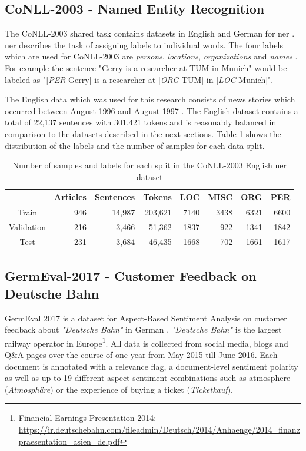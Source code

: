 \subsection{CoNLL-2003 - Named Entity Recognition}

The CoNLL-2003 shared task contains datasets in English and German for \acrfull{ner} \cite{Erik2003}. \gls{ner} describes the task of assigning labels to individual words. The four labels which are used for CoNLL-2003 are \textit{persons}, \textit{locations}, \textit{organizations} and \textit{names} \cite{Erik2003}. For example the sentence "Gerry is a researcher at TUM in Munich" would be labeled as "[\textit{PER} Gerry] is a researcher at [\textit{ORG} TUM] in [\textit{LOC} Munich]".
\medskip

The English data which was used for this research consists of news stories which occurred between August 1996 and August 1997 \cite{Erik2003}. The English dataset contains a total of 22,137 sentences with 301,421 tokens and is reasonably balanced in comparison to the datasets described in the next sections. Table \ref{tab:05_conll2003DatasetStats} shows the distribution of the labels and the number of samples for each data split.

\begin{table}
	\centering
	\begin{tabular}{crrrrrrr}
		\toprule
		& Articles & Sentences & Tokens & LOC & MISC & ORG & PER \\ 
		\midrule
		Train & 946 & 14,987 & 203,621 & 7140 & 3438 & 6321 & 6600 \\ 
		Validation & 216 & 3,466 & 51,362 & 1837 & 922 & 1341 & 1842 \\ 
		Test & 231 & 3,684 & 46,435 & 1668 & 702 & 1661 & 1617 \\ 
		\bottomrule 
	\end{tabular} 
\caption{Number of samples and labels for each split in the CoNLL-2003 English \gls{ner} dataset}
\label{tab:05_conll2003DatasetStats}
\end{table}


\subsection{GermEval-2017 - Customer Feedback on Deutsche Bahn}
\label{sec:05_germeval}
GermEval 2017 is a dataset for Aspect-Based Sentiment Analysis on customer feedback about \textit{"Deutsche Bahn"} in German \cite{Wojatzki2017}. \textit{"Deutsche Bahn"} is the largest railway operator in Europe\footnote{Financial Earnings Presentation 2014: \url{https://ir.deutschebahn.com/fileadmin/Deutsch/2014/Anhaenge/2014_finanzpraesentation_asien_de.pdf}}. All data is collected from social media, blogs and Q\&A pages over the course of one year from May 2015 till June 2016. Each document is annotated with a relevance flag, a document-level sentiment polarity as well as up to 19 different aspect-sentiment combinations such as atmosphere {(\textit{Atmosphäre})} or the experience of buying a ticket {(\textit{Ticketkauf})}.
\medskip

